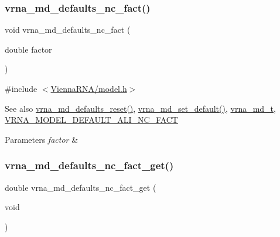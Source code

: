 \subsubsection{\texorpdfstring{vrna\+\_\+md\+\_\+defaults\+\_\+nc\+\_\+fact()}{vrna\_md\_defaults\_nc\_fact()}}
{\footnotesize\ttfamily void vrna\+\_\+md\+\_\+defaults\+\_\+nc\+\_\+fact (\begin{DoxyParamCaption}\item[{double}]{factor }\end{DoxyParamCaption})}



{\ttfamily \#include $<$\hyperlink{model_8h}{Vienna\+R\+N\+A/model.\+h}$>$}

\begin{DoxySeeAlso}{See also}
\hyperlink{group__model__details_ga70834424cf804d149937de89f80ceb45}{vrna\+\_\+md\+\_\+defaults\+\_\+reset()}, \hyperlink{group__model__details_ga8ac6ff84936282436f822644bf841f66}{vrna\+\_\+md\+\_\+set\+\_\+default()}, \hyperlink{group__model__details_ga1f8a10e12a0a1915f2a4eff0b28ea17c}{vrna\+\_\+md\+\_\+t}, \hyperlink{group__model__details_ga8f774daaafec28160c1ca5d09f2cbdba}{V\+R\+N\+A\+\_\+\+M\+O\+D\+E\+L\+\_\+\+D\+E\+F\+A\+U\+L\+T\+\_\+\+A\+L\+I\+\_\+\+N\+C\+\_\+\+F\+A\+CT} 
\end{DoxySeeAlso}

\begin{DoxyParams}{Parameters}
{\em factor} & \\
\hline
\end{DoxyParams}
\mbox{\label{group__model__details_ga7ac759eaa7159bf5f022745f5da59508}} 
\subsubsection{\texorpdfstring{vrna\+\_\+md\+\_\+defaults\+\_\+nc\+\_\+fact\+\_\+get()}{vrna\_md\_defaults\_nc\_fact\_get()}}
{\footnotesize\ttfamily double vrna\+\_\+md\+\_\+defaults\+\_\+nc\+\_\+fact\+\_\+get (\begin{DoxyParamCaption}\item[{void}]{ }\end{DoxyParamCaption})}



